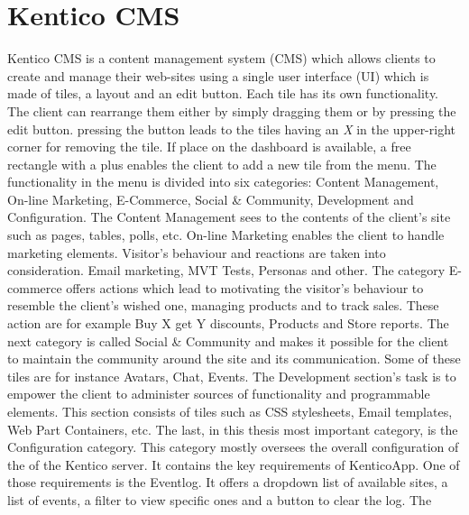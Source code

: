 \section{Kentico CMS} \label{analysisKenticoCMS}
Kentico CMS is a content management system (CMS) which allows clients to create and manage their web-sites using a single user interface (UI) which is made of tiles, a layout and an edit button. Each tile has its own functionality. The client can rearrange them either by simply dragging them or by pressing the edit button. pressing the button leads to the tiles having an \textit{X} in the upper-right corner for removing the tile. If place on the dashboard is available, a free rectangle with a plus enables the client to add a new tile from the menu. The functionality in the menu is divided into six categories: Content Management, On-line Marketing, E-Commerce, Social \& Community, Development and Configuration. The Content Management sees to the contents of the client's site such as pages, tables, polls, etc. On-line Marketing enables the client to handle marketing elements. Visitor's behaviour and reactions are taken into consideration. Email marketing, MVT Tests, Personas and other. The category E-commerce offers actions which lead to motivating the visitor's behaviour to resemble the client's wished one, managing products and to track sales. These action are for example Buy X get Y discounts, Products and Store reports. The next category is called Social \& Community and makes it possible for the client to maintain the community around the site and its communication. Some of these tiles are for instance Avatars, Chat, Events. The Development section's task is to empower the client to administer sources of functionality and programmable elements. This section consists of tiles such as CSS stylesheets, Email templates, Web Part Containers, etc. The last, in this thesis most important category, is the Configuration category. This category mostly oversees the overall configuration of the of the Kentico server. It contains the key requirements of KenticoApp. One of those requirements is the Eventlog. It offers a dropdown list of available sites, a list of events, a filter to view specific ones and a button to clear the log. The 
